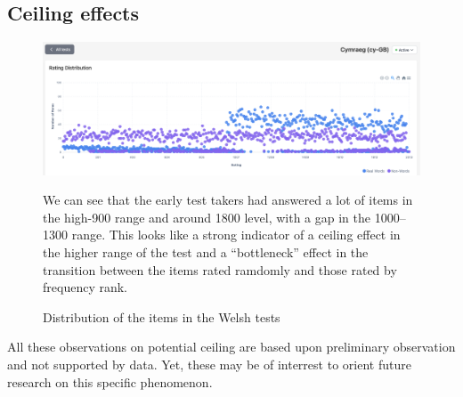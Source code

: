 \subsection{Ceiling effects}
\begin{figure}
    \centering
    \includegraphics[width=0.8\linewidth]{figures/cy-distribution.png}
    \caption{Distribution of the items in the Welsh tests}
    \medskip
    \small
    We can see that the early test takers had answered a lot of items in the high-900 range and around 1800 level, with a gap in the 1000–1300 range. This looks like a strong indicator of a ceiling effect in the higher range of the test and a ``bottleneck'' effect in the transition between the items rated ramdomly and those rated by frequency rank.
\end{figure}\label{fig:cy-distribution}

All these observations on potential ceiling are based upon preliminary observation and not supported by data. Yet, these may be of interrest to orient future research on this specific phenomenon. 

